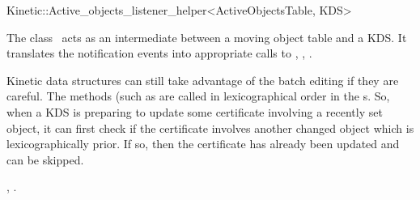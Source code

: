 

\begin{ccRefClass}{Kinetic::Active_objects_listener_helper<ActiveObjectsTable, KDS>}  %


\ccDefinition
  
The class \ccRefName\ acts as an intermediate between a moving object
table and a KDS. It translates the
 notification events into
appropriate calls to , ,
. 

Kinetic data structures can still take advantage of the batch editing
if they are careful. The methods (such as  are
called in lexicographical order in the s. So, when a KDS is
preparing to update some certificate involving a recently set object,
it can first check if the certificate involves another changed object
which is lexicographically prior. If so, then the certificate has
already been updated and can be skipped.



\ccSeeAlso

,
.


\end{ccRefClass}


